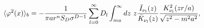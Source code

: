 \begin{equation}
\langle \varphi ^{2}(x)\rangle _{b}=-\frac{1}{\pi ar^{n}S_{D}\sigma ^{D-1}}%
\sum_{l=0}^{\infty }D_{l}\int_{ma}^{\infty }dz\ z\frac{\bar{I}_{\nu _{l} }(z)}{%
\bar{K}_{\nu _{l} }(z)}\frac{K_{\nu _{l}
}^{2}(zr/a)}{\sqrt{z^{2}-m^{2}a^{2}}}, \label{regsquareout}
\end{equation}

